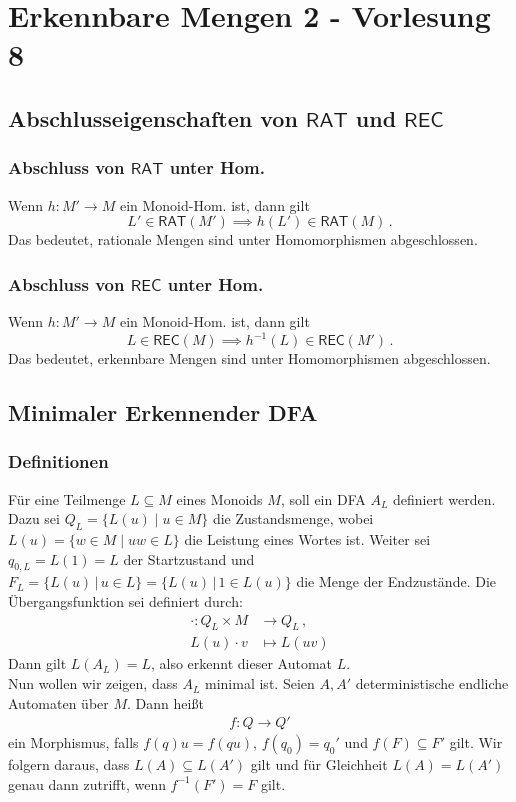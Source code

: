 \documentclass[12pt, german]{article}
\newcommand{\inv}{^{-1}}
\newcommand{\rat}{\mathsf{RAT}}
\newcommand{\rec}{\mathsf{REC}}
\begin{document}
	\section{Erkennbare Mengen 2 - Vorlesung 8}
	\subsection{Abschlusseigenschaften von $\rat$ und $\rec$}
	\subsubsection{Abschluss von $\rat$ unter Hom.}
	Wenn $h: M' \to M$ ein Monoid-Hom. ist, dann gilt $$L' \in \rat(M') \implies h(L') \in \rat(M)\, .$$
	Das bedeutet, rationale Mengen sind unter Homomorphismen abgeschlossen.
	
	\subsubsection{Abschluss von $\rec$ unter Hom.}
	Wenn $h: M' \to M$ ein Monoid-Hom. ist, dann gilt $$L \in \rec(M) \implies h\inv(L) \in \rec(M')\, .$$
	Das bedeutet, erkennbare Mengen sind unter Homomorphismen abgeschlossen.
	
	\subsection{Minimaler Erkennender DFA}
	\subsubsection{Definitionen}
	\label{sec:min_dfa}
	Für eine Teilmenge $L \subseteq M$ eines Monoids $M$, soll ein DFA $A_L$ definiert werden.
	Dazu sei $Q_L = \{L(u) \mid u \in M\}$ die Zustandsmenge, wobei $L(u) = \{ w \in M \mid uw \in L\}$ die Leistung eines Wortes ist. Weiter sei $q_{0,L}=L(1)=L$ der Startzustand und $F_L=\{L(u) \, | \, u \in L\}= \{L(u) \, | \, 1 \in L(u)\}$ die Menge der Endzustände.
	Die Übergangsfunktion sei definiert durch:
	\begin{align*}
		\cdot: Q_L \times M  &\to Q_L\, ,\\
		L(u)\cdot v &\mapsto L(uv)
	\end{align*}
	Dann gilt $L(A_L) = L$, also erkennt dieser Automat $L$.\\
	Nun wollen wir zeigen, dass $A_L$ minimal ist.
	Seien $A, A'$ deterministische endliche Automaten über $M$. Dann hei\ss t 
	\begin{align*}
		f: Q \to Q'
	\end{align*} ein Morphismus, falls $f(q)u=f(qu)$, $f(q_0) = q_0'$ und $f(F) \subseteq F'$ gilt.
	Wir folgern daraus, dass $L(A) \subseteq L(A')$ gilt und für Gleichheit $L(A) = L(A')$ genau dann zutrifft, wenn $f\inv(F') = F$ gilt. 
	
\end{document}
